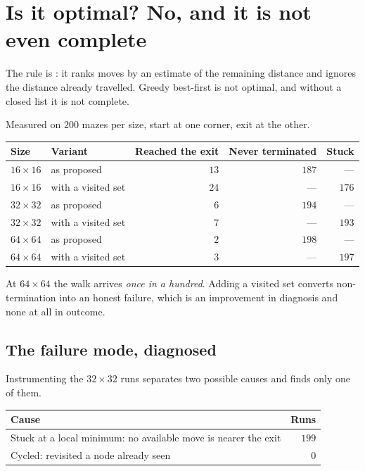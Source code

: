 \documentclass[11pt,a4paper]{article}
\begin{document}
\section{Is it optimal? No, and it is not even complete}

\begin{keypoint}
The rule is : it ranks moves by an estimate of
the remaining distance and ignores the distance already travelled. Greedy
best-first is not optimal, and without a closed list it is not complete.
\end{keypoint}

Measured on $200$ mazes per size, start at one corner, exit at the other.

\begin{center}
\begin{tabular}{@{}llrrr@{}}
  \toprule
  Size & Variant & Reached the exit & Never terminated & Stuck \\
  \midrule
  $16\times16$ & as proposed        & $13$ & $187$ & --- \\
  $16\times16$ & with a visited set & $24$ & ---   & $176$ \\
  $32\times32$ & as proposed        & $6$  & $194$ & --- \\
  $32\times32$ & with a visited set & $7$  & ---   & $193$ \\
  $64\times64$ & as proposed        & $2$  & $198$ & --- \\
  $64\times64$ & with a visited set & $3$  & ---   & $197$ \\
  \bottomrule
\end{tabular}
\end{center}

At $64\times64$ the walk arrives \emph{once in a hundred}. Adding a visited set
converts non-termination into an honest failure, which is an improvement in
diagnosis and none at all in outcome.

\subsection{The failure mode, diagnosed}

Instrumenting the $32\times32$ runs separates two possible causes and finds only
one of them.

\begin{center}
\begin{tabular}{@{}lr@{}}
  \toprule
  Cause & Runs \\
  \midrule
  Stuck at a local minimum: no available move is nearer the exit & $199$ \\
  Cycled: revisited a node already seen & $0$ \\
  \bottomrule
\end{tabular}
\end{center}
\end{document}
